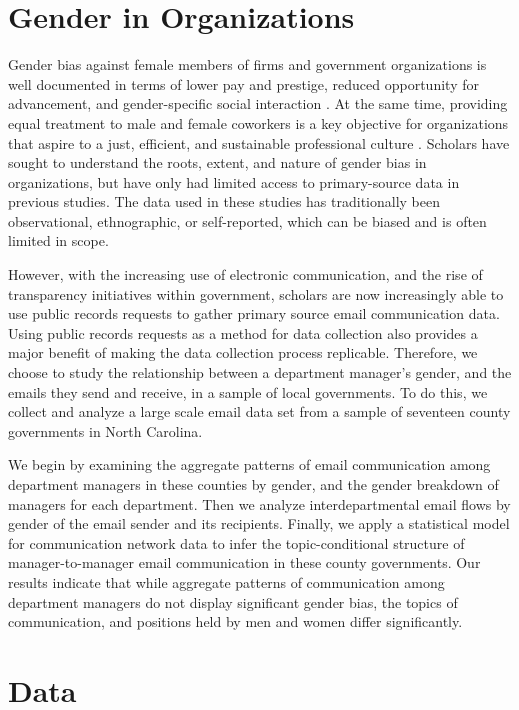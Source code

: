\documentclass{pnastwo}
\begin{document}
\begin{article}
\section{Gender in Organizations}
Gender bias against female members of firms and government organizations is well documented in terms of lower pay and prestige, reduced opportunity for advancement, and gender-specific social interaction \citep{Brass1985, Bielby1986a, Ibarra1992, Albrecht2003, Duncan2004}. At the same time, providing equal treatment to male and female coworkers is a key objective for organizations that aspire to a just, efficient, and sustainable professional culture \citep{Ely2000}. Scholars have sought to understand the roots, extent, and nature of gender bias in organizations, but have only had limited access to primary-source data in previous studies. The data used in these studies \citep[e.g.,][]{Castilla2005, Adams2007, Elsesser2011} has traditionally been observational, ethnographic, or self-reported, which can be biased and is often limited in scope. 
	
However, with the increasing use of electronic communication, and the rise of transparency initiatives within government, scholars are now increasingly able to use public records requests to gather primary source email communication data. Using public records requests as a method for data collection also provides a major benefit of making the data collection process replicable. Therefore, we choose to study the relationship between a department manager's gender, and the emails they send and receive, in a sample of local governments. To do this, we collect and analyze a large scale email data set from a sample of seventeen county governments in North Carolina. 

We begin by examining the aggregate patterns of email communication among department managers in these counties by gender, and the gender breakdown of managers for each department. Then we analyze interdepartmental email flows by gender of the email sender and its recipients. Finally, we apply a statistical model for communication network data to infer the topic-conditional structure of manager-to-manager email communication in these county governments. Our results indicate that while aggregate patterns of communication among department managers do not display significant gender bias, the topics of communication, and positions held by men and women differ significantly.


\section{Data}


\end{article}
\end{document}

